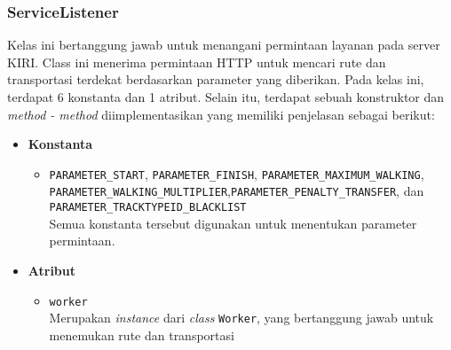 \subsubsection{ServiceListener}
\label{subss:servicelistener}
Kelas ini bertanggung jawab untuk menangani permintaan layanan pada server KIRI. Class ini menerima permintaan HTTP untuk mencari rute dan transportasi terdekat berdasarkan parameter yang diberikan. Pada kelas ini, terdapat 6 konstanta dan 1 atribut. Selain itu, terdapat sebuah konstruktor dan \textit{method - method} diimplementasikan yang memiliki penjelasan sebagai berikut:
\begin{itemize}
    \item \textbf{Konstanta}
    \begin{itemize}
        \item \texttt{PARAMETER\_START}, \texttt{PARAMETER\_FINISH}, \texttt{PARAMETER\_MAXIMUM\_WALKING}, \\ \texttt{PARAMETER\_WALKING\_MULTIPLIER},\texttt{PARAMETER\_PENALTY\_TRANSFER}, dan \\ \texttt{PARAMETER\_TRACKTYPEID\_BLACKLIST}
        \\ Semua konstanta tersebut digunakan untuk menentukan parameter permintaan.
    \end{itemize}

    \item \textbf{Atribut}
    \begin{itemize}
        \item \texttt{worker}
        \\ Merupakan \textit{instance} dari \textit{class} \texttt{Worker}, yang bertanggung jawab untuk menemukan rute dan transportasi 
    \end{itemize}


\end{itemize}

